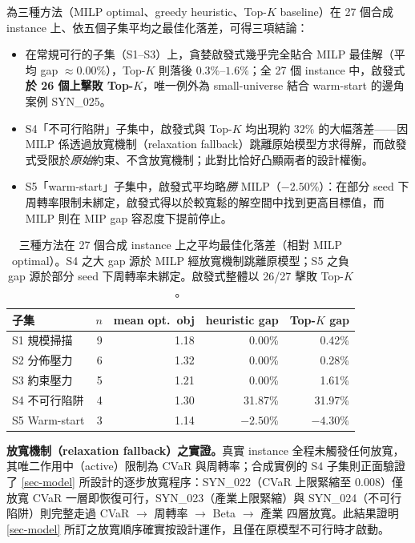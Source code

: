 \documentclass[11pt,a4paper]{article}
\newenvironment{itemizeTight}{\begin{itemize}\vspace{-8pt}}{\end{itemize}\vspace{-8pt}}
\begin{document}
 為三種方法（MILP optimal、greedy heuristic、Top-$K$ baseline）在 27 個合成 instance 上、依五個子集平均之最佳化落差，可得三項結論：
\begin{itemizeTight}
    \item 在常規可行的子集（S1--S3）上，貪婪啟發式幾乎完全貼合 MILP 最佳解（平均 gap $\approx 0.00\%$），Top-$K$ 則落後 $0.3\%$--$1.6\%$；全 27 個 instance 中，啟發式\textbf{於 26 個上擊敗 Top-$K$}，唯一例外為 small-universe 結合 warm-start 的邊角案例 SYN\_025。
    \item S4「不可行陷阱」子集中，啟發式與 Top-$K$ 均出現約 $32\%$ 的大幅落差——因 MILP 係透過放寬機制（relaxation fallback）跳離原始模型方求得解，而啟發式受限於\emph{原始}約束、不含放寬機制；此對比恰好凸顯兩者的設計權衡。
    \item S5「warm-start」子集中，啟發式平均略\emph{勝} MILP（$-2.50\%$）：在部分 seed 下周轉率限制未綁定，啟發式得以於較寬鬆的解空間中找到更高目標值，而 MILP 則在 MIP gap 容忍度下提前停止。
\end{itemizeTight}

\begin{table}[!hbt]
\centering
\small
\begin{tabular}{l r r r r}
\toprule
子集 & $n$ & mean opt.\ obj & heuristic gap & Top-$K$ gap \\
\midrule
S1 規模掃描   & 9 & 1.18 & 0.00\% & 0.42\% \\
S2 分佈壓力   & 6 & 1.32 & 0.00\% & 0.28\% \\
S3 約束壓力   & 5 & 1.21 & 0.00\% & 1.61\% \\
S4 不可行陷阱 & 4 & 1.30 & 31.87\% & 31.97\% \\
S5 Warm-start & 3 & 1.14 & $-2.50\%$ & $-4.30\%$ \\
\bottomrule
\end{tabular}
\caption{三種方法在 27 個合成 instance 上之平均最佳化落差（相對 MILP optimal）。S4 之大 gap 源於 MILP 經放寬機制跳離原模型；S5 之負 gap 源於部分 seed 下周轉率未綁定。啟發式整體以 26/27 擊敗 Top-$K$。}
\label{tab:synth-bench}
\end{table}

\textbf{放寬機制（relaxation fallback）之實證。}{}真實 instance 全程未觸發任何放寬，其唯二作用中（active）限制為 CVaR 與周轉率；合成實例的 S4 子集則正面驗證了 \cref{sec-model} 所設計的逐步放寬程序：SYN\_022（CVaR 上限緊縮至 $0.008$）僅放寬 CVaR 一層即恢復可行，SYN\_023（產業上限緊縮）與 SYN\_024（不可行陷阱）則完整走過 CVaR $\to$ 周轉率 $\to$ Beta $\to$ 產業 四層放寬。此結果證明 \cref{sec-model} 所訂之放寬順序確實按設計運作，且僅在原模型不可行時才啟動。
\end{document}
